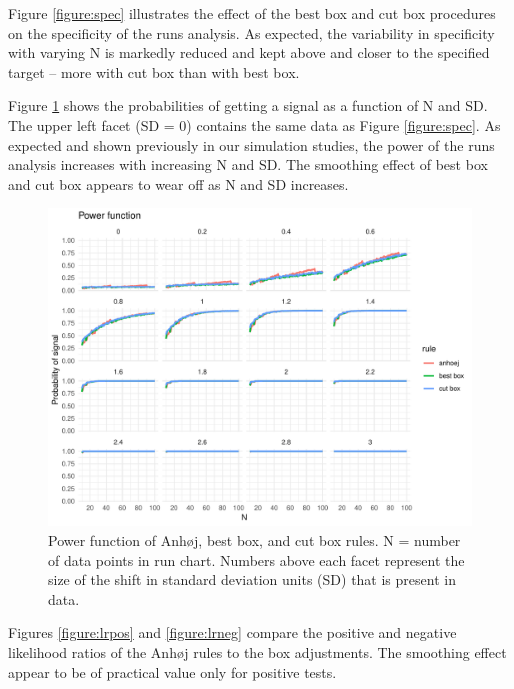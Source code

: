 Figure \ref{figure:spec} illustrates the effect of the best box and cut
box procedures on the specificity of the runs analysis. As expected, the
variability in specificity with varying N is markedly reduced and kept
above and closer to the specified target -- more with cut box than with
best box.

Figure \ref{figure:pwr} shows the probabilities of getting a signal as a
function of N and SD. The upper left facet (SD = 0) contains the same
data as Figure \ref{figure:spec}. As expected and shown previously in
our simulation studies, the power of the runs analysis increases with
increasing N and SD. The smoothing effect of best box and cut box
appears to wear off as N and SD increases.

\begin{figure}[htbp]
  \centering
  \includegraphics[width=\textwidth]{fig_pwr.pdf}
  \caption{Power function of Anhøj, best box, and cut box rules.
           N = number of data points in run chart.
           Numbers above each facet represent the size of the shift in standard
           deviation units (SD) that is present in data.}
  \label{figure:pwr}
\end{figure}

Figures \ref{figure:lrpos} and \ref{figure:lrneg} compare the positive
and negative likelihood ratios of the Anhøj rules to the box
adjustments. The smoothing effect appear to be of practical value only
for positive tests.

